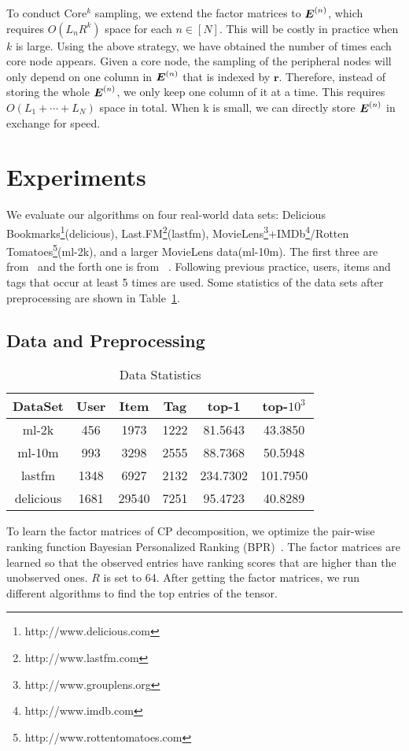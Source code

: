 \documentclass[letterpaper]{article}
\newcommand{\M}[1]{{\boldsymbol{{\MakeUppercase{#1}}}}}
\newcommand{\FacMat}[2]{\M{#1}^{(#2)}}
\newcommand{\Table}[1]{Table~\ref{table:#1}}
\begin{document}
To conduct Core$^k$ sampling,
we extend the factor matrices to $\FacMat{E}{n}$,
which requires $O(L_nR^k)$ space for each $n\in[N]$.
This will be costly in practice when $k$ is large.
Using the above strategy, we have obtained the number of times each core node appears.
Given a core node, the sampling of the peripheral nodes
will only depend on one column in $\FacMat{E}{n}$ that is indexed by $\boldsymbol{r}$.
Therefore, instead of storing the whole $\FacMat{E}{n}$,
we only keep one column of it at a time.
This requires $O(L_1+\cdots+L_N)$ space in total.
When k is small, we can directly store $\FacMat{E}{n}$ in exchange for speed.
\section{Experiments}
%
%
%
%
%
We evaluate our algorithms on four real-world data sets:
Delicious Bookmarks\footnote{http://www.delicious.com}(delicious),
Last.FM\footnote{http://www.lastfm.com}(lastfm),
MovieLens\footnote{http://www.grouplens.org}+IMDb\footnote{http://www.imdb.com}/Rotten Tomatoes\footnote{http://www.rottentomatoes.com}(ml-2k),
and a larger MovieLens data(ml-10m).
The first three are from~\cite{Cantador:RecSys2011} and the forth one is from ~\cite{Harper2015}.
Following previous practice, users, items and tags that occur at least 5 times are used.
Some statistics of the data sets after preprocessing are shown in \Table{Data}.
\subsection{Data and Preprocessing}
\begin{table}[!]
  \centering
  \begin{tabular}{|c|c|c|c|c|c|}
    \hline
    DataSet     & User & Item    & Tag    & top-1   & top-$10^3$\\
    \hline
    ml-2k       & 456  &  1973   &  1222  & 81.5643  & 43.3850 \\
    ml-10m      & 993  &  3298   &  2555  & 88.7368 & 50.5948 \\
    lastfm      & 1348 &  6927   &  2132  & 234.7302 & 101.7950\\
    delicious   & 1681 &  29540  &  7251  & 95.4723  & 40.8289 \\
    \hline
  \end{tabular}
  \caption{Data Statistics}
  \label{table:Data}
\end{table}
To learn the factor matrices of CP decomposition,
we optimize the pair-wise
ranking function Bayesian Personalized Ranking (BPR)~\cite{Rendle_BPR,Rendle_RTF}.
The factor matrices are learned so that the observed entries have ranking scores that are higher than the unobserved ones. 
$R$ is set to 64. 
After getting the factor matrices, 
we run different algorithms to find the top entries of the tensor.
\end{document}
